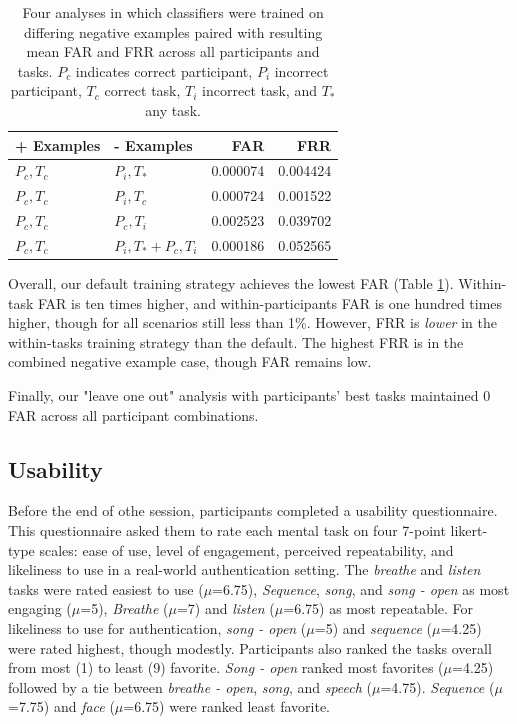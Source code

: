 \documentclass{sigchi}
\begin{document}
\begin{table}[h]
\begin{center}
\begin{tabular}{llrr}
 \textbf{+ Examples} & \textbf{- Examples} & \textbf{FAR} & \textbf{FRR} \\
\hline
$P_c, T_c$ & $P_i, T_*$ & 0.000074 & 0.004424\\
$P_c, T_c$ & $P_i, T_c$ & 0.000724 & 0.001522\\
$P_c, T_c$ & $P_c, T_i$ & 0.002523 & 0.039702\\
$P_c, T_c$ & $P_i, T_* + P_c, T_i$ & 0.000186 & 0.052565\\
\hline
\end{tabular}
\end{center}
\caption{Four analyses in which classifiers were trained on differing negative examples paired with resulting mean FAR and FRR across all participants and tasks. $P_c$ indicates correct participant, $P_i$ incorrect participant, $T_c$ correct task, $T_i$ incorrect task, and $T_*$ any task.}
\label{tab:compare}
\end{table}

Overall, our default training strategy achieves the lowest FAR (Table \ref{tab:compare}). Within-task FAR is ten times higher, and within-participants FAR is one hundred times higher, though for all scenarios still less than 1\%.
However, FRR is \textit{lower} in the within-tasks training strategy than the default. The highest FRR is in the combined negative example case, though FAR remains low.

Finally, our "leave one out" analysis with participants' best tasks maintained 0 FAR across all participant combinations. 

\subsection{Usability}

Before the end of othe session, participants completed a usability questionnaire. This questionnaire asked them to rate each mental task on four 7-point likert-type scales: ease of use, level of engagement, perceived repeatability, and likeliness to use in a real-world authentication setting. The \textit{breathe} and \textit{listen} tasks were rated easiest to use (\(\mu\)=6.75), \textit{Sequence}, \textit{song}, and \textit{song - open} as most engaging (\(\mu\)=5), \textit{Breathe} (\(\mu\)=7) and \textit{listen} (\(\mu\)=6.75) as most repeatable. For likeliness to use for authentication, \textit{song - open} (\(\mu\)=5) and \textit{sequence} (\(\mu\)=4.25) were rated highest, though modestly. Participants also ranked the tasks overall from most (1) to least (9) favorite. \textit{Song - open} ranked most favorites (\(\mu\)=4.25) followed by a tie between \textit{breathe - open}, \textit{song}, and \textit{speech} (\(\mu\)=4.75). \textit{Sequence} (\(\mu\)=7.75) and \textit{face} (\(\mu\)=6.75) were ranked least favorite.
\end{document}

